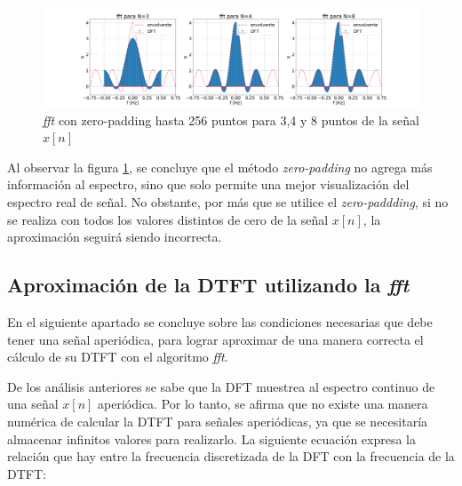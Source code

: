 \documentclass[11pt,a4paper]{article}
\begin{document}
    \begin{figure}[H]
    \centering
    \includegraphics[width=\textwidth]{Img/punto_3_c.png}
    \caption{\textit{fft} con zero-padding hasta 256 puntos para 3,4 y 8 puntos de la señal $x[n]$}
    \label{fig.1c}
    \end{figure}
    
    Al observar la figura \ref{fig.1c}, se concluye que el método \textit{zero-padding} no agrega más información al espectro, sino que solo permite una mejor visualización del espectro real de señal. No obstante, por más que se utilice el \textit{zero-paddding}, si no se realiza con todos los valores distintos de cero de la señal $x[n]$, la aproximación seguirá siendo incorrecta.
    


    \subsection{Aproximación de la DTFT utilizando la \textit{fft}}
        En el siguiente apartado se concluye sobre las condiciones necesarias que debe tener una señal aperiódica, para lograr aproximar de una manera correcta el cálculo de su DTFT con el algoritmo \textit{fft}. 
        
        
        De los análisis anteriores se sabe que la DFT muestrea al espectro continuo de una señal $x[n]$ aperiódica. Por lo tanto, se afirma que no existe una manera numérica de calcular la DTFT para señales aperiódicas, ya que se necesitaría almacenar infinitos valores para realizarlo. La siguiente ecuación expresa la relación que hay entre la frecuencia discretizada de la DFT con la frecuencia de la DTFT: 
        
\end{document}
